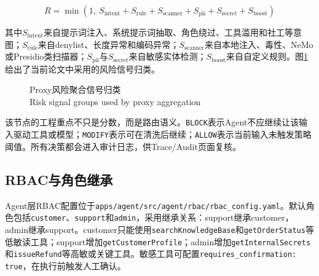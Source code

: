 \documentclass[UTF8,zihao=-4,scheme=chinese,fontset=none]{ctexart}
\newcommand{\code}[1]{{\ttfamily\small\nolinkurl{#1}}}
\newcommand{\bicaption}[2]{\caption{#1\\\small #2}}
\begin{document}
\begin{equation}
R=\min(1,\ S_{\mathrm{intent}}+S_{\mathrm{rule}}+S_{\mathrm{scanner}}+S_{\mathrm{pii}}+S_{\mathrm{secret}}+S_{\mathrm{boost}})
\end{equation}

其中$S_{\mathrm{intent}}$来自提示词注入、系统提示词抽取、角色绕过、工具滥用和社工等意图；$S_{\mathrm{rule}}$来自denylist、长度异常和编码异常；$S_{\mathrm{scanner}}$来自本地注入、毒性、NeMo或Presidio类扫描器；$S_{\mathrm{pii}}$与$S_{\mathrm{secret}}$来自敏感实体检测；$S_{\mathrm{boost}}$来自自定义规则。图\ref{fig:risk}给出了当前论文中采用的风险信号归类。

\begin{figure}[tbp]
  \centering
  \bicaption{Proxy风险聚合信号归类}{Risk signal groups used by proxy aggregation}
  \label{fig:risk}
\end{figure}

该节点的工程重点不只是分数，而是路由语义。\code{BLOCK}表示Agent不应继续让该输入驱动工具或模型；\code{MODIFY}表示可在清洗后继续；\code{ALLOW}表示当前输入未触发策略阈值。所有决策都会进入审计日志，供Trace/Audit页面复核。

\subsection{RBAC与角色继承}

Agent层RBAC配置位于\code{apps/agent/src/agent/rbac/rbac_config.yaml}。默认角色包括\code{customer}、\code{support}和\code{admin}，采用继承关系：support继承customer，admin继承support。customer只能使用\code{searchKnowledgeBase}和\code{getOrderStatus}等低敏读工具；support增加\code{getCustomerProfile}；admin增加\code{getInternalSecrets}和\code{issueRefund}等高敏或关键工具。敏感工具可配置\code{requires_confirmation: true}，在执行前触发人工确认。
\end{document}
